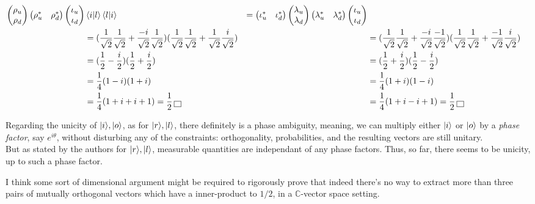 \documentclass[solutions.tex]{subfiles}
\begin{document}
\begin{align*}
\begin{pmatrix}
	\rho_u \\
	\rho_d \\
\end{pmatrix}
\begin{pmatrix}
	\rho_u^* & \rho_d^* \\
\end{pmatrix}
\begin{pmatrix}
	\iota_u \\
	\iota_d \\
\end{pmatrix} &
\left\langle i \middle| l \right\rangle\left\langle l \middle| i \right\rangle &=
\begin{pmatrix}
	\iota_u^* & \iota_d^* \\
\end{pmatrix}
\begin{pmatrix}
	\lambda_u \\
	\lambda_d \\
\end{pmatrix}
\begin{pmatrix}
	\lambda_u^* & \lambda_d^* \\
\end{pmatrix}
\begin{pmatrix}
	\iota_u \\
	\iota_d \\
\end{pmatrix} \\
~ &= (\frac1{\sqrt2}\frac1{\sqrt2}+\frac{-i}{\sqrt2}\frac{1}{\sqrt2})
(\frac1{\sqrt2}\frac1{\sqrt2}+\frac{1}{\sqrt2}\frac{i}{\sqrt2})
& ~ &= (\frac1{\sqrt2}\frac1{\sqrt2}+\frac{-i}{\sqrt2}\frac{-1}{\sqrt2})
(\frac1{\sqrt2}\frac1{\sqrt2}+\frac{-1}{\sqrt2}\frac{i}{\sqrt2}) \\
~ &= (\frac1{2}-\frac{i}{2})(\frac1{2}+\frac{i}{2})
& ~ &= (\frac1{2}+\frac{i}{2})(\frac1{2}-\frac{i}{2}) \\
~ &= \frac1{4}(1-i)(1+i)
& ~ &= \frac1{4}(1+i)(1-i) \\
~ &= \frac1{4}(1+i+i+1) = \frac1{2}\,\boxed{\,}
& ~ &= \frac1{4}(1+i-i+1) = \frac1{2}\,\boxed{\,} \\
\end{align*}

\hrr

Regarding the unicity of $|i\rangle, |o\rangle$, as for $|r\rangle, |l\rangle$,
there definitely is a phase ambiguity, meaning, we can multiply either
$|i\rangle$ or $|o\rangle$ by a \textit{phase factor}, say $e^{i\theta}$,
without disturbing any of the constraints: orthogonality, probabilities,
and the resulting vectors are still unitary. \\

But as stated by the authors for $|r\rangle, |l\rangle$, measurable
quantities are independant of any phase factors. Thus, so far,
there seems to be unicity, up to such a phase factor. \\

\begin{remark} I think some sort of dimensional argument might
be required to rigorously prove that indeed there's no way to extract
more than three pairs of mutually orthogonal vectors which have a
inner-product to $1/2$, in a $\mathbb{C}$-vector space setting.
\end{remark}
\end{document}
